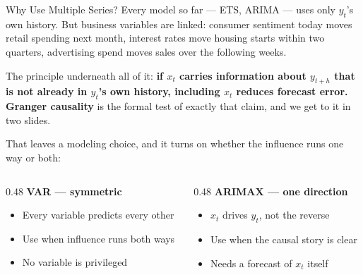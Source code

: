 \documentclass[aspectratio=169, 11pt]{beamer}
\begin{document}
\begin{frame}{Why Use Multiple Series?}
  Every model so far --- ETS, ARIMA --- uses only $y_t$'s own history. But business
  variables are linked: consumer sentiment today moves retail spending next month,
  interest rates move housing starts within two quarters, advertising spend moves sales
  over the following weeks.

  \vspace{0.1cm}
  The principle underneath all of it: \textbf{if $x_t$ carries information about $y_{t+h}$
  that is not already in $y_t$'s own history, including $x_t$ reduces forecast error.}
  \textbf{Granger causality} \parencite{Granger1969} is the formal test of exactly that
  claim, and we get to it in two slides.

  \vspace{0.15cm}
  That leaves a modeling choice, and it turns on whether the influence runs one way or both:
  \begin{columns}[T]
    \begin{column}{0.48\textwidth}
      \textbf{VAR --- symmetric}
      \begin{itemize}\small\itemsep0pt
        \item Every variable predicts every other
        \item Use when influence runs both ways
        \item No variable is privileged
      \end{itemize}
    \end{column}
    \begin{column}{0.48\textwidth}
      \textbf{ARIMAX --- one direction}
      \begin{itemize}\small\itemsep0pt
        \item $x_t$ drives $y_t$, not the reverse
        \item Use when the causal story is clear
        \item Needs a forecast of $x_t$ itself
      \end{itemize}
    \end{column}
  \end{columns}
\end{frame}
\end{document}
